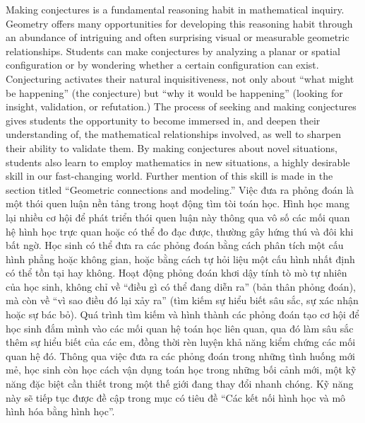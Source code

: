 \documentclass[
  10pt,
  a4paper,
  landscape,
  twoside,
  openany
]{scrbook}
\newcommand{\EN}[1]{#1}
\newcommand{\VI}[1]{#1}
\newcommand{\NOTE}[1]{#1}
\begin{document}
\TriPara
{
\EN{Making conjectures is a fundamental reasoning habit in mathematical inquiry. Geometry offers many opportunities for developing this reasoning habit through an abundance of intriguing and often surprising visual or measurable geometric relationships. Students can make conjectures by analyzing a planar or spatial configuration or by wondering whether a certain configuration can exist. Conjecturing activates their natural inquisitiveness, not only about “what might be happening” (the conjecture) but ``why it would be happening'' (looking for insight, validation, or refutation.) The process of seeking and making conjectures gives students the opportunity to become immersed in, and deepen their understanding of, the mathematical relationships involved, as well to sharpen their ability to validate them. By making conjectures about novel situations, students also learn to employ mathematics in new situations, a highly desirable skill in our fast-changing world. Further mention of this skill is made in the section titled ``Geometric connections and modeling.''}
}
{
\VI{Việc đưa ra phỏng đoán là một thói quen luận nền tảng trong hoạt động tìm tòi toán học. Hình học mang lại nhiều cơ hội để phát triển thói quen luận này thông qua vô số các mối quan hệ hình học trực quan hoặc có thể đo đạc được, thường gây hứng thú và đôi khi bất ngờ. Học sinh có thể đưa ra các phỏng đoán bằng cách phân tích một cấu hình phẳng hoặc không gian, hoặc bằng cách tự hỏi liệu một cấu hình nhất định có thể tồn tại hay không. Hoạt động phỏng đoán khơi dậy tính tò mò tự nhiên của học sinh, không chỉ về ``điều gì có thể đang diễn ra'' (bản thân phỏng đoán), mà còn về ``vì sao điều đó lại xảy ra'' (tìm kiếm sự hiểu biết sâu sắc, sự xác nhận hoặc sự bác bỏ). Quá trình tìm kiếm và hình thành các phỏng đoán tạo cơ hội để học sinh đắm mình vào các mối quan hệ toán học liên quan, qua đó làm sâu sắc thêm sự hiểu biết của các em, đồng thời rèn luyện khả năng kiểm chứng các mối quan hệ đó. Thông qua việc đưa ra các phỏng đoán trong những tình huống mới mẻ, học sinh còn học cách vận dụng toán học trong những bối cảnh mới, một kỹ năng đặc biệt cần thiết trong một thế giới đang thay đổi nhanh chóng. Kỹ năng này sẽ tiếp tục được đề cập trong mục có tiêu đề ``Các kết nối hình học và mô hình hóa bằng hình học''.}
}
{
\NOTE{}
}
\end{document}
